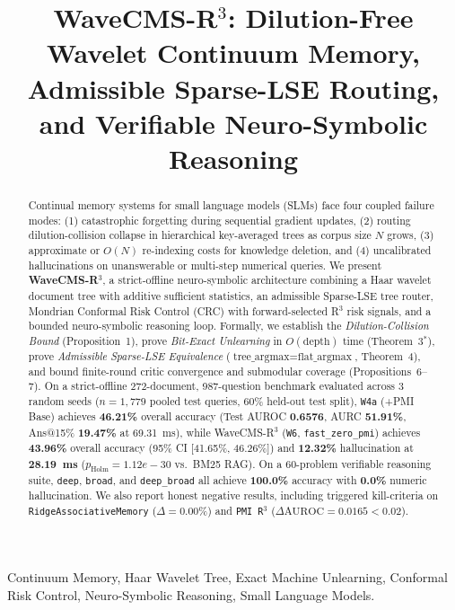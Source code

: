 \documentclass[conference]{IEEEtran}
\title{WaveCMS-R$^3$: Dilution-Free Wavelet Continuum Memory, Admissible Sparse-LSE Routing, and Verifiable Neuro-Symbolic Reasoning}
\author{\IEEEauthorblockN{Sovereign Brain Research Group}
\IEEEauthorblockA{Department of Computer Science \& Artificial Intelligence \\
Strict-Offline Air-Gapped NCKH Benchmark Suite \\
Email: research@sovereignbrain.local}}
\begin{document}
\maketitle

\begin{abstract}
Continual memory systems for small language models (SLMs) face four coupled failure modes: (1) catastrophic forgetting during sequential gradient updates, (2) routing dilution-collision collapse in hierarchical key-averaged trees as corpus size $N$ grows, (3) approximate or $O(N)$ re-indexing costs for knowledge deletion, and (4) uncalibrated hallucinations on unanswerable or multi-step numerical queries. We present \textbf{WaveCMS-R$^3$}, a strict-offline neuro-symbolic architecture combining a Haar wavelet document tree with additive sufficient statistics, an admissible Sparse-LSE tree router, Mondrian Conformal Risk Control (CRC) with forward-selected R$^3$ risk signals, and a bounded neuro-symbolic reasoning loop. Formally, we establish the \emph{Dilution-Collision Bound} (Proposition~1), prove \emph{Bit-Exact Unlearning} in $O(\text{depth})$ time (Theorem~3$^*$), prove \emph{Admissible Sparse-LSE Equivalence} ($\text{tree\_argmax} = \text{flat\_argmax}$, Theorem~4), and bound finite-round critic convergence and submodular coverage (Propositions~6--7). On a strict-offline 272-document, 987-question benchmark evaluated across 3 random seeds ($n=1{,}779$ pooled test queries, 60\% held-out test split), \texttt{W4a} (+PMI Base) achieves \textbf{46.21\%} overall accuracy (Test AUROC \textbf{0.6576}, AURC \textbf{51.91\%}, Ans@15\% \textbf{19.47\%} at 69.31~ms), while WaveCMS-R$^3$ (\texttt{W6}, \texttt{fast\_zero\_pmi}) achieves \textbf{43.96\%} overall accuracy (95\% CI [41.65\%, 46.26\%]) and \textbf{12.32\%} hallucination at \textbf{28.19~ms} ($p_{\text{Holm}} = 1.12e-30$ vs.\ BM25 RAG). On a 60-problem verifiable reasoning suite, \texttt{deep}, \texttt{broad}, and \texttt{deep\_broad} all achieve \textbf{100.0\%} accuracy with \textbf{0.0\%} numeric hallucination. We also report honest negative results, including triggered kill-criteria on \texttt{RidgeAssociativeMemory} ($\Delta = 0.00\%$) and \texttt{PMI R$^3$} ($\Delta\text{AUROC} = 0.0165 < 0.02$).
\end{abstract}

\begin{IEEEkeywords}
Continuum Memory, Haar Wavelet Tree, Exact Machine Unlearning, Conformal Risk Control, Neuro-Symbolic Reasoning, Small Language Models.
\end{IEEEkeywords}
\end{document}

